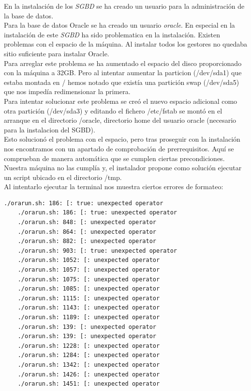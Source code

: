 \documentclass{article}
\begin{document}
En la instalación de los \emph{SGBD} se ha creado un usuario para la administración de la base de datos.\\
Para la base de datos Oracle se ha creado un usuario \emph{oracle}. En especial en la instalación de este \emph{SGBD} ha sido problematica en la instalación. Existen problemas con el espacio de la máquina. Al instalar todos los gestores no quedaba sitio suficiente para instalar Oracle.\\
Para arreglar este problema se ha aumentado el espacio del disco proporcionado con la máquina a 32GB. Pero al intentar aumentar la particion (/dev/sda1)
que estaba montada en / hemos notado que existía una partición swap (/dev/sda5) que nos impedía redimensionar la primera.\\
Para intentar solucionar este problema se creó el nuevo espacio adicional como otra partición (/dev/sda3) y editando el fichero /etc/fstab se montó en el arranque
en el directorio /oracle, directorio home del usuario oracle (necesario para la instalacion del SGBD).\\
Esto solucionó el problema con el espacio, pero tras proseguir con la instalación nos encontramos con un apartado de comprobación de prerrequisitos. Aquí se comprueban
de manera automática que se cumplen ciertas precondiciones. Nuestra máquina no las cumplía y, el instalador propone como solución ejecutar un script ubicado en el directorio
/tmp.\\
Al intentarlo ejecutar la terminal nos muestra ciertos errores de formateo:

\begin{lstlisting}[language=bash]
	./orarun.sh: 186: [: true: unexpected operator
	./orarun.sh: 186: [: true: unexpected operator
	./orarun.sh: 848: [: unexpected operator
	./orarun.sh: 864: [: unexpected operator
	./orarun.sh: 882: [: unexpected operator
	./orarun.sh: 903: [: true: unexpected operator
	./orarun.sh: 1052: [: unexpected operator
	./orarun.sh: 1057: [: unexpected operator
	./orarun.sh: 1075: [: unexpected operator
	./orarun.sh: 1085: [: unexpected operator
	./orarun.sh: 1115: [: unexpected operator
	./orarun.sh: 1143: [: unexpected operator
	./orarun.sh: 1189: [: unexpected operator
	./orarun.sh: 139: [: unexpected operator
	./orarun.sh: 139: [: unexpected operator
	./orarun.sh: 1228: [: unexpected operator
	./orarun.sh: 1284: [: unexpected operator
	./orarun.sh: 1342: [: unexpected operator
	./orarun.sh: 1426: [: unexpected operator
	./orarun.sh: 1451: [: unexpected operator
\end{lstlisting}
\end{document}
